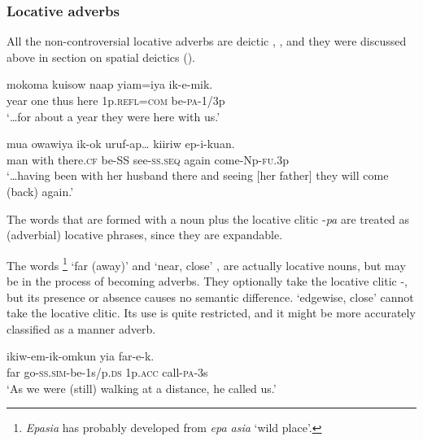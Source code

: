\subsubsection{Locative adverbs}\label{sec:3.9.1.1}
{}
All the non-controversial locative adverbs are deictic , , and they were discussed above in section on spatial deictics (). 

\ea%
\label{ex:3:x1933}
\gll {\dots}mokoma kuisow naap  yiam=iya ik-e-mik. \\
year one thus here 1p.\textsc{refl}=\textsc{com} be-\textsc{pa}-1/3p\\
\glt`{\dots}for about a year they were here with us.'
\z

\ea%
\label{ex:3:x1934}
\gll {\dots}mua owawiya  ik-ok uruf-ap{\dots} kiiriw ep-i-kuan. \\
man with there.\textsc{cf} be-SS see-\textsc{ss}.\textsc{seq} again come-Np-\textsc{fu}.3p\\
\glt`{\dots}having been with her husband there and seeing [her father] they will come (back) again.'
\z

The words that are formed with a noun plus the locative clitic \nobreakdash-\textit{pa} are treated as (adverbial) locative phrases, since they are expandable.

The words  \footnote{\textit{Epasia} has probably developed from \textit{epa asia} `wild place'.} `far (away)'  and  `near, close' ,  are actually locative nouns, but may be in the process of becoming adverbs. They optionally take the locative clitic \nobreakdash-, but its presence or absence causes no semantic difference.  `edgewise, close'  cannot take the locative clitic. Its use is quite restricted, and it might be more accurately classified as a manner adverb. 

\ea%
\label{ex:3:x467}
\gll {} ikiw-em-ik-omkun yia far-e-k. \\
far go-\textsc{ss}.\textsc{sim}-be-1s/p.\textsc{ds} 1p.\textsc{acc} call-\textsc{pa}-3s\\
\glt`As we were (still) walking at a distance, he called us.'
\z

